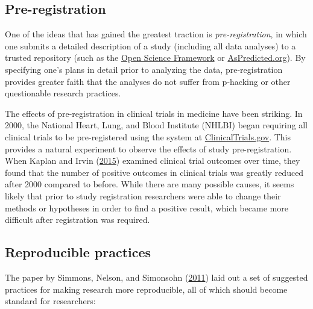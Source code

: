 \documentclass[12pt,]{book}
\theoremstyle{definition}
\theoremstyle{definition}
\theoremstyle{definition}
\theoremstyle{remark}
\begin{document}
\hypertarget{pre-registration}{%
\subsection{Pre-registration}\label{pre-registration}}

One of the ideas that has gained the greatest traction is \emph{pre-registration}, in which one submits a detailed description of a study (including all data analyses) to a trusted repository (such as the \href{http://osf.io}{Open Science Framework} or \href{http://aspredicted.org}{AsPredicted.org}). By specifying one's plans in detail prior to analyzing the data, pre-registration provides greater faith that the analyses do not suffer from p-hacking or other questionable research practices.

The effects of pre-registration in clinical trials in medicine have been striking. In 2000, the National Heart, Lung, and Blood Institute (NHLBI) began requiring all clinical trials to be pre-registered using the system at \href{http://clinicaltrials.gov}{ClinicalTrials.gov}. This provides a natural experiment to observe the effects of study pre-registration. When Kaplan and Irvin (\protect\hyperlink{ref-kapl:irvi:2015}{2015}) examined clinical trial outcomes over time, they found that the number of positive outcomes in clinical trials was greatly reduced after 2000 compared to before. While there are many possible causes, it seems likely that prior to study registration researchers were able to change their methods or hypotheses in order to find a positive result, which became more difficult after registration was required.

\hypertarget{reproducible-practices}{%
\subsection{Reproducible practices}\label{reproducible-practices}}

The paper by Simmons, Nelson, and Simonsohn (\protect\hyperlink{ref-simm:nels:simo:2011}{2011}) laid out a set of suggested practices for making research more reproducible, all of which should become standard for researchers:
\end{document}
